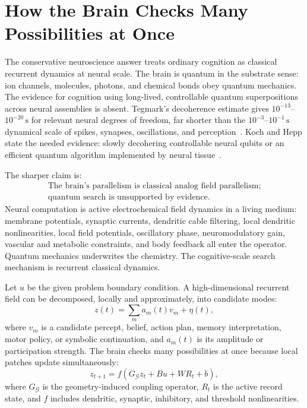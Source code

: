 \documentclass[11pt]{article}
\theoremstyle{remark}
\theoremstyle{plain}
\begin{document}
\section{How the Brain Checks Many Possibilities at Once}

The conservative neuroscience answer treats ordinary cognition as classical recurrent dynamics at neural scale. The brain is quantum in the substrate sense: ion channels, molecules, photons, and chemical bonds obey quantum mechanics. The evidence for cognition using long-lived, controllable quantum superpositions across neural assemblies is absent. Tegmark's decoherence estimate gives \(10^{-13}\)--\(10^{-20}\,\mathrm{s}\) for relevant neural degrees of freedom, far shorter than the \(10^{-3}\)--\(10^{-1}\,\mathrm{s}\) dynamical scale of spikes, synapses, oscillations, and perception~\cite{Tegmark2000}. Koch and Hepp state the needed evidence: slowly decohering controllable neural qubits or an efficient quantum algorithm implemented by neural tissue~\cite{KochHepp2006}.

The sharper claim is:
\[
\boxed{
\begin{gathered}
\text{The brain's parallelism is classical analog field parallelism;}\\
\text{quantum search is unsupported by evidence.}
\end{gathered}
}
\]
Neural computation is active electrochemical field dynamics in a living medium: membrane potentials, synaptic currents, dendritic cable filtering, local dendritic nonlinearities, local field potentials, oscillatory phase, neuromodulatory gain, vascular and metabolic constraints, and body feedback all enter the operator. Quantum mechanics underwrites the chemistry. The cognitive-scale search mechanism is recurrent classical dynamics.

Let \(u\) be the given problem boundary condition. A high-dimensional recurrent field can be decomposed, locally and approximately, into candidate modes:
\[
z(t)=\sum_m a_m(t)v_m+\eta(t),
\]
where \(v_m\) is a candidate percept, belief, action plan, memory interpretation, motor policy, or symbolic continuation, and \(a_m(t)\) is its amplitude or participation strength. The brain checks many possibilities at once because local patches update simultaneously:
\[
z_{t+1}=f(G_{\mathcal G}z_t+Bu+WR_t+b),
\]
where \(G_{\mathcal G}\) is the geometry-induced coupling operator, \(R_t\) is the active record state, and \(f\) includes dendritic, synaptic, inhibitory, and threshold nonlinearities.
\end{document}
